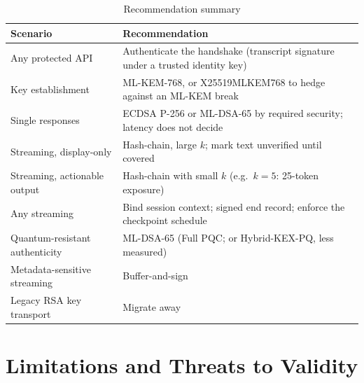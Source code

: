 \documentclass[conference]{IEEEtran}
\begin{document}
\begin{table}[t]
\centering
\caption{Recommendation summary}
\label{tab:recommendations}
\setlength{\tabcolsep}{3pt}
\footnotesize
\begin{tabular}{@{}L{2.9cm}L{4.9cm}@{}}
\toprule
Scenario & Recommendation \\
\midrule
Any protected API & Authenticate the handshake (transcript signature under a trusted identity key) \\
Key establishment & ML-KEM-768, or X25519MLKEM768 to hedge against an ML-KEM break \\
Single responses & ECDSA P-256 or ML-DSA-65 by required security; latency does not decide \\
Streaming, display-only & Hash-chain, large $k$; mark text unverified until covered \\
Streaming, actionable output & Hash-chain with small $k$ (e.g.\ $k=5$: 25-token exposure) \\
Any streaming & Bind session context; signed end record; enforce the checkpoint schedule \\
Quantum-resistant authenticity & ML-DSA-65 (Full PQC; or Hybrid-KEX-PQ, less measured) \\
Metadata-sensitive streaming & Buffer-and-sign \\
Legacy RSA key transport & Migrate away \\
\bottomrule
\end{tabular}
\end{table}

\FloatBarrier
\section{Limitations and Threats to Validity}\label{sec:limitations}
\end{document}
